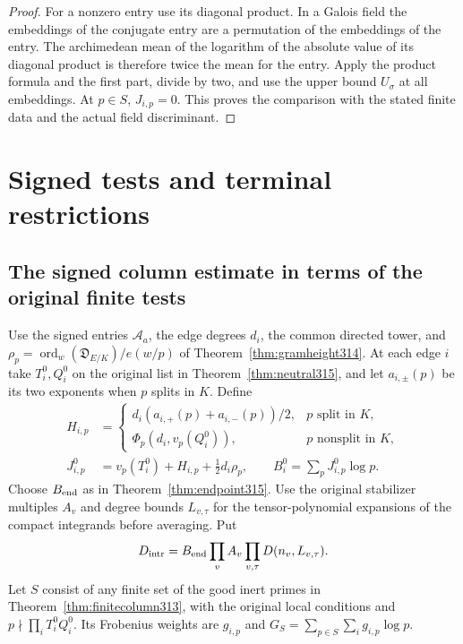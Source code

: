 \documentclass[a4paper,11pt]{article}
\theoremstyle{definition}
\theoremstyle{remark}
\numberwithin{equation}{section}
\begin{document}
\begin{proof}
For a nonzero entry use its diagonal product. In a Galois field
the embeddings of the conjugate entry are a permutation of the
embeddings of the entry. The archimedean mean of the logarithm
of the absolute value of its diagonal product is therefore
twice the mean for the entry. Apply the product formula and the
first part, divide by two, and use the upper bound \(U_\sigma\)
at all embeddings. At \(p\in S\), \(J_{i,p}=0\). This proves
the comparison with the stated finite data and the actual field
discriminant.
\end{proof}

\section{Signed tests and terminal restrictions}\label{nav:chapter-signed-terminal-tests}
\subsection{The signed column estimate in terms of the original finite tests}\label{nav:IX-65}
Use the signed entries \(\mathcal A_a\), the edge degrees
\(d_i\), the common directed tower, and
\(\rho_p=\operatorname{ord}_w(\mathfrak D_{E/K})/e(w/p)\)
of Theorem~\ref{thm:gramheight314}. At each edge \(i\) take
\(T_i^0,Q_i^0\) on the original list in
Theorem~\ref{thm:neutral315}, and let \(a_{i,\pm}(p)\) be its
two exponents when \(p\) splits in \(K\). Define
\[
 \begin{aligned}
 H_{i,p}&=
 \begin{cases}
 d_i(a_{i,+}(p)+a_{i,-}(p))/2,&p\text{ split in }K,\\
 \Phi_p(d_i,v_p(Q_i^0)),&p\text{ nonsplit in }K,
 \end{cases}\\
 J^0_{i,p}&=v_p(T_i^0)+H_{i,p}+\tfrac12d_i\rho_p,\qquad
 B_i^0=\sum_p J^0_{i,p}\log p .
 \end{aligned}
\]
Choose \(B_{\rm end}\) as in Theorem~\ref{thm:endpoint315}.
Use the original stabilizer multiples \(A_v\) and degree bounds
\(L_{v,\tau}\) for the tensor-polynomial expansions of the
compact integrands before averaging. Put
\[
 D_{\rm intr}=B_{\rm end}\prod_v A_v
                         \prod_{v,\tau} D(n_v,L_{v,\tau}).
\]
Let \(S\) consist of any finite set of the good inert primes
in Theorem~\ref{thm:finitecolumn313}, with the original local
conditions and \(p\nmid\prod_i T_i^0Q_i^0\). Its Frobenius
weights are \(g_{i,p}\) and
\(G_S=\sum_{p\in S}\sum_i g_{i,p}\log p\).
\end{document}
